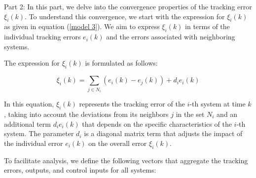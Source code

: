 \documentclass[journal,onecolumn]{IEEEtran}
\begin{document}








Part 2: In this part, we delve into the convergence properties of the tracking error \(\xi_i(k)\). To understand this convergence, we start with the expression for \(\xi_i(k)\) as given in equation (\ref{model 3}). We aim to express \(\xi_i(k)\) in terms of the individual tracking errors \(e_i(k)\) and the errors associated with neighboring systems.

The expression for \(\xi_i(k)\) is formulated as follows:

\begin{equation}
    \label{model 32}
    \xi_i(k) = \sum_{j \in N_i} (e_i(k) - e_j(k)) + d_i e_i(k)
\end{equation}

In this equation, \(\xi_i(k)\) represents the tracking error of the \(i\)-th system at time \(k\), taking into account the deviations from its neighbors \(j\) in the set \(N_i\) and an additional term \(d_i e_i(k)\) that depends on the specific characteristics of the \(i\)-th system. The parameter \(d_i\) is a diagonal matrix term that adjusts the impact of the individual error \(e_i(k)\) on the overall error \(\xi_i(k)\).

To facilitate analysis, we define the following vectors that aggregate the tracking errors, outputs, and control inputs for all systems:
\end{document}
